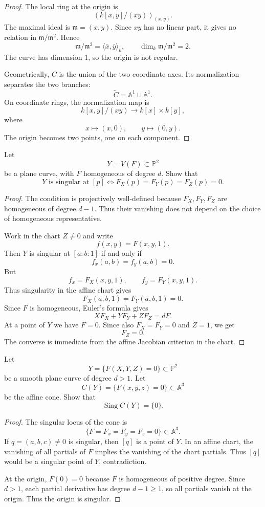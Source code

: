 \begin{proof}
The local ring at the origin is
$$
\left(k[x,y]/(xy)\right)_{(x,y)}.
$$
The maximal ideal is $\mathfrak m=(x,y)$. Since $xy$
has no linear part, it gives no relation in
$\mathfrak m/\mathfrak m^2$. Hence
$$
\mathfrak m/\mathfrak m^2
=\langle \bar x,\bar y\rangle_k,
\qquad
\dim_k\mathfrak m/\mathfrak m^2=2.
$$
The curve has dimension $1$, so the origin is not
regular.

Geometrically, $C$ is the union of the two coordinate
axes. Its normalization separates the two branches:
$$
\widetilde C=\mathbb{A}^1\sqcup \mathbb{A}^1.
$$
On coordinate rings, the normalization map is
$$
k[x,y]/(xy)\longrightarrow k[x]\times k[y],
$$
where
$$
x\longmapsto (x,0),
\qquad
 y\longmapsto (0,y).
$$
The origin becomes two points, one on each component.
\end{proof}

\begin{exercise}
\label{exercise-projective-jacobian-criterion-plane-curve}
Let
$$
Y=V(F)\subset \mathbb{P}^2
$$
be a plane curve, with $F$ homogeneous of degree $d$.
Show that
$$
Y\text{ is singular at }[p]
\iff
F_X(p)=F_Y(p)=F_Z(p)=0.
$$
\end{exercise}

\begin{proof}
The condition is projectively well-defined because
$F_X,F_Y,F_Z$ are homogeneous of degree $d-1$.
Thus their vanishing does not depend on the choice of
homogeneous representative.

Work in the chart $Z\neq 0$ and write
$$
f(x,y)=F(x,y,1).
$$
Then $Y$ is singular at $[a:b:1]$ if and only if
$$
f_x(a,b)=f_y(a,b)=0.
$$
But
$$
f_x=F_X(x,y,1),
\qquad
f_y=F_Y(x,y,1).
$$
Thus singularity in the affine chart gives
$$
F_X(a,b,1)=F_Y(a,b,1)=0.
$$
Since $F$ is homogeneous, Euler's formula gives
$$
XF_X+YF_Y+ZF_Z=dF.
$$
At a point of $Y$ we have $F=0$. Since also
$F_X=F_Y=0$ and $Z=1$, we get
$$
F_Z=0.
$$
The converse is immediate from the affine Jacobian
criterion in the chart.
\end{proof}

\begin{exercise}
\label{exercise-cone-over-smooth-plane-curve-singularities}
Let
$$
Y=\{F(X,Y,Z)=0\}\subset \mathbb{P}^2
$$
be a smooth plane curve of degree $d>1$. Let
$$
C(Y)=\{F(x,y,z)=0\}\subset \mathbb{A}^3
$$
be the affine cone. Show that
$$
\operatorname{Sing}C(Y)=\{0\}.
$$
\end{exercise}

\begin{proof}
The singular locus of the cone is
$$
\{F=F_x=F_y=F_z=0\}\subset \mathbb{A}^3.
$$
If $q=(a,b,c)\neq 0$ is singular, then $[q]$ is a
point of $Y$. In an affine chart, the vanishing of all
partials of $F$ implies the vanishing of the chart
partials. Thus $[q]$ would be a singular point of
$Y$, contradiction.

At the origin, $F(0)=0$ because $F$ is homogeneous of
positive degree. Since $d>1$, each partial derivative
has degree $d-1\geq 1$, so all partials vanish at the
origin. Thus the origin is singular.
\end{proof}




